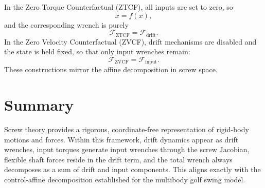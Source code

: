 \documentclass[12pt]{article}
\begin{document}
In the Zero Torque Counterfactual (ZTCF), all inputs are set to zero, so
\begin{equation}
\dot{x} = f(x),
\end{equation}
and the corresponding wrench is purely
\begin{equation}
\mathcal{F}_{\mathrm{ZTCF}} = \mathcal{F}_{\mathrm{drift}}.
\end{equation}
In the Zero Velocity Counterfactual (ZVCF), drift mechanisms are disabled and the state is held fixed, so that only input wrenches remain:
\begin{equation}
\mathcal{F}_{\mathrm{ZVCF}} = \mathcal{F}_{\mathrm{input}}.
\end{equation}
These constructions mirror the affine decomposition in screw space.

\section{Summary}

Screw theory provides a rigorous, coordinate-free representation of rigid-body motions and forces. Within this framework, drift dynamics appear as drift wrenches, input torques generate input wrenches through the screw Jacobian, flexible shaft forces reside in the drift term, and the total wrench always decomposes as a sum of drift and input components. This aligns exactly with the control-affine decomposition established for the multibody golf swing model.
\end{document}
